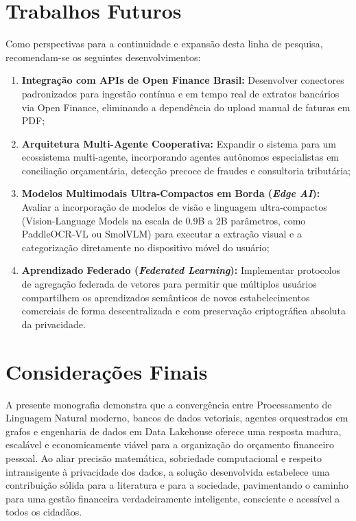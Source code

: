 \documentclass[
	12pt,				
	openright,			
	oneside,			
	a4paper,			
	english,			
	brazil				
	]{abntex2}
\begin{document}
\section{Trabalhos Futuros}
\label{sec:concl_trabalhos_futuros}

Como perspectivas para a continuidade e expansão desta linha de pesquisa, recomendam-se os seguintes desenvolvimentos:
\begin{enumerate}
    \item \textbf{Integração com APIs de Open Finance Brasil:} Desenvolver conectores padronizados para ingestão contínua e em tempo real de extratos bancários via Open Finance, eliminando a dependência do upload manual de faturas em PDF;
    \item \textbf{Arquitetura Multi-Agente Cooperativa:} Expandir o sistema para um ecossistema multi-agente, incorporando agentes autônomos especialistas em conciliação orçamentária, detecção precoce de fraudes e consultoria tributária;
    \item \textbf{Modelos Multimodais Ultra-Compactos em Borda (\textit{Edge AI}):} Avaliar a incorporação de modelos de visão e linguagem ultra-compactos (Vision-Language Models na escala de 0.9B a 2B parâmetros, como PaddleOCR-VL ou SmolVLM) para executar a extração visual e a categorização diretamente no dispositivo móvel do usuário;
    \item \textbf{Aprendizado Federado (\textit{Federated Learning}):} Implementar protocolos de agregação federada de vetores para permitir que múltiplos usuários compartilhem os aprendizados semânticos de novos estabelecimentos comerciais de forma descentralizada e com preservação criptográfica absoluta da privacidade.
\end{enumerate}

\section{Considerações Finais}
\label{sec:concl_consideracoes_finais}

A presente monografia demonstra que a convergência entre Processamento de Linguagem Natural moderno, bancos de dados vetoriais, agentes orquestrados em grafos e engenharia de dados em Data Lakehouse oferece uma resposta madura, escalável e economicamente viável para a organização do orçamento financeiro pessoal. Ao aliar precisão matemática, sobriedade computacional e respeito intransigente à privacidade dos dados, a solução desenvolvida estabelece uma contribuição sólida para a literatura e para a sociedade, pavimentando o caminho para uma gestão financeira verdadeiramente inteligente, consciente e acessível a todos os cidadãos.
\end{document}

